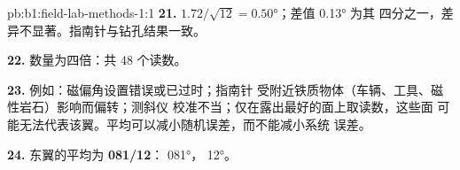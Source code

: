\begin{solution}{pb:b1:field-lab-methods-1:1}
\textbf{21.} $1.72/\sqrt{12} = \ang{0.50}$；差值 \ang{0.13} 为其
四分之一，差异不显著。指南针与钻孔结果一致。

\textbf{22.} 数量为四倍：共 48 个读数。

\textbf{23.} 例如：磁偏角设置错误或已过时；指南针
受附近铁质物体（车辆、工具、磁性岩石）影响而偏转；测斜仪
校准不当；仅在露出最好的面上取读数，这些面
可能无法代表该翼。平均可以减小随机误差，而不能减小系统
误差。

\textbf{24.} 东翼的平均为 \textbf{081/12}：
\ang{081}， \ang{12}。
\end{solution}
